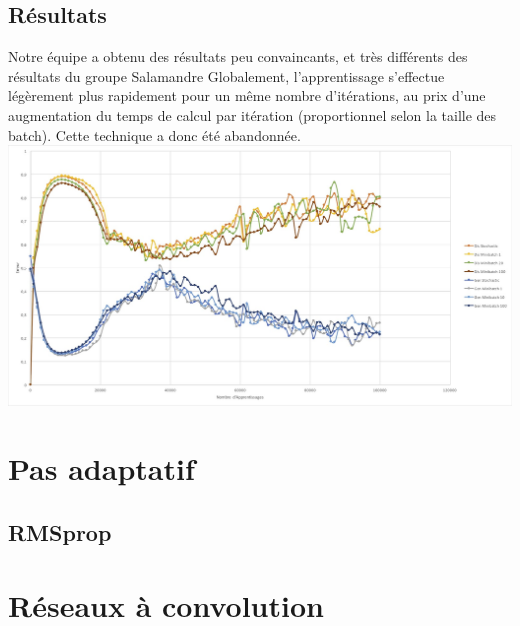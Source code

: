 \subsection{Résultats}
Notre équipe a obtenu des résultats peu convaincants, et très différents des résultats du groupe Salamandre 
Globalement, l'apprentissage s'effectue légèrement plus rapidement pour un même nombre d'itérations, au prix d'une augmentation du temps de calcul par itération (proportionnel selon la taille des batch). Cette technique a donc été abandonnée.
\includegraphics[width=1.5\textwidth]{images/08-gan_ameliorations_resultats_1.jpg}

\section{Pas adaptatif}
\subsection{RMSprop}

\section{Réseaux à convolution}



